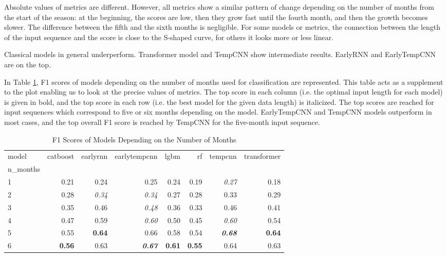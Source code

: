 \documentclass{article}
\begin{document}
Absolute values of metrics are different. However, all metrics show a similar pattern of change depending on the number of months from the start of the season: at the beginning, the scores are low, then they grow fast until the fourth month, and then the growth becomes slower. The difference between the fifth and the sixth months is negligible. For some models or metrics, the connection between the length of the input sequence and the score is close to the S-shaped curve, for others it looks more or less linear.

Classical models in general underperform. Transformer model and TempCNN show intermediate results. EarlyRNN and EarlyTempCNN are on the top.

In Table \ref{Table 4.1.2}, F1 scores of models depending on the number of months used for classification are represented. This table acts as a supplement to the plot enabling us to look at the precise values of metrics. The top score in each column (i.e. the optimal input length for each model) is given in bold, and the top score in each row (i.e. the best model for the given data length) is italicized. The top scores are reached for input sequences which correspond to five or six months depending on the model. EarlyTempCNN and TempCNN models outperform in most cases, and the top overall  F1 score is reached by TempCNN for the five-month input sequence. 

\begin{table}
\centering
\caption{F1 Scores of Models Depending on the Number of Months}
\label{Table 4.1.2}
\begin{tabular}{lrrrrrrr}
\toprule
model &  catboost &  earlyrnn &  earlytempcnn &  lgbm &    rf &  tempcnn &  transformer \\
n\_months &           &           &               &       &       &          &              \\
\midrule
1        &      0.21 &      0.24 &          0.25 &  0.24 &  0.19 &     \textit{0.27} &         0.18 \\
2        &      0.28 &      \textit{0.34} &          \textit{0.34} &  0.27 &  0.28 &     0.33 &         0.29 \\
3        &      0.35 &      0.46 &         \textit{ 0.48} &  0.36 &  0.33 &     0.46 &         0.41 \\
4        &      0.47 &      0.59 &          \textit{0.60} &  0.50 &  0.45 &     \textit{0.60} &         0.54 \\
5        &      0.55 &      \textbf{0.64} &          0.66 &  0.58 &  0.54 &     \textbf{\textit{0.68}} &         \textbf{0.64} \\
6        &     \textbf{ 0.56} &      0.63 &          \textit{\textbf{0.67}} &  \textbf{0.61} &  \textbf{0.55} &     0.64 &         0.63 \\
\bottomrule
\end{tabular}
\end{table}
\end{document}

